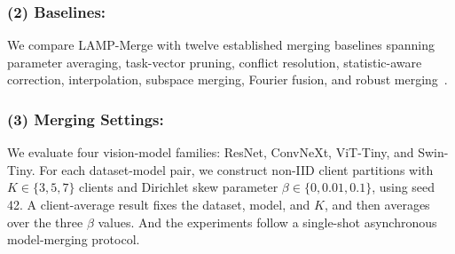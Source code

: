 \documentclass[letterpaper]{article} %
\begin{document}
\subsubsection{(2) Baselines:}

We compare LAMP-Merge with twelve established merging baselines spanning parameter averaging, task-vector pruning, conflict resolution, statistic-aware correction, interpolation, subspace merging, Fourier fusion, and robust merging~\cite{yadav2023tiesmergingresolvinginterferencemerging,yu2024languagemodelssupermario,jin2025datalessknowledgefusionmerging,wu_parameter_2025,davari2024modelbreadcrumbsscalingmultitask,jang2025modelstockneedjust,ilharco2023editingmodelstaskarithmetic,marczak2025taskleftbehindisotropic,zheng2025freemergingfouriertransformefficient,zeng2025robustmergeparameterefficientmodelmerging}.

\subsubsection{(3) Merging Settings:}



We evaluate four vision-model families: ResNet, ConvNeXt, ViT-Tiny, and Swin-Tiny\cite{he2016deep,liu2022convnet,dosovitskiy2021image,liu2021swin}. For each dataset-model pair, we construct non-IID client partitions with $K\in\{3,5,7\}$ clients and Dirichlet skew parameter $\beta\in\{0,0.01,0.1\}$, using seed 42\cite{hsu2019measuringeffectsnonidenticaldata}. A client-average result fixes the dataset, model, and $K$, and then averages over the three $\beta$ values. And the experiments follow a single-shot asynchronous model-merging protocol.


\end{document}
